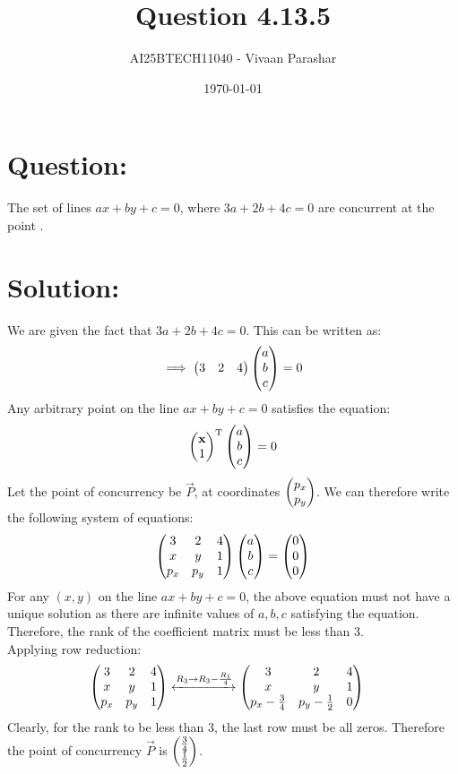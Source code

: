 \documentclass[a4paper, 12pt]{article}
\title{Question 4.13.5}
\author{AI25BTECH11040 - Vivaan Parashar}
\date{\today}
\begin{document}
\maketitle

\section{Question: }
The set of lines $ax + by + c = 0$, where $3a + 2b + 4c = 0$ are concurrent at the point \underline{\hspace{2cm}}.

\section{Solution: }
We are given the fact that $3a + 2b + 4c = 0$. This can be written as:
\begin{align}
    \implies \begin{pmatrix}3 & 2 & 4\end{pmatrix} \begin{pmatrix}a \\ b \\ c\end{pmatrix} = 0 \label{eq1}
\end{align}
Any arbitrary point on the line $ax + by + c = 0$ satisfies the equation:
\begin{align}
    \begin{pmatrix}\mathbf{x} \\ 1\end{pmatrix}^\mathrm{T} \begin{pmatrix}a \\ b \\ c\end{pmatrix} = 0 \label{eq2}
\end{align}
Let the point of concurrency be $\vec{P}$, at coordinates $\begin{pmatrix}p_x \\ p_y\end{pmatrix}$. We can therefore write the following system of equations:
\begin{align}
    \begin{pmatrix}3 & 2 & 4 \\ x & y & 1 \\ p_x & p_y & 1\end{pmatrix} \begin{pmatrix}a \\ b \\ c\end{pmatrix} = \begin{pmatrix}0 \\ 0 \\ 0\end{pmatrix} \label{eq3}
\end{align}
For any $(x, y)$ on the line $ax + by + c = 0$, the above equation must not have a unique solution as there are infinite values of $a, b, c$ satisfying the equation. Therefore, the rank of the coefficient matrix must be less than 3.\\
Applying row reduction:
\begin{align}
    \begin{pmatrix}3 & 2 & 4 \\ x & y & 1 \\ p_x & p_y & 1\end{pmatrix} &\xleftrightarrow{R_3 \rightarrow R_3 - \frac{R_1}{4}} \begin{pmatrix}3 & 2 & 4 \\ x & y & 1 \\ p_x - \frac{3}{4} & p_y - \frac{1}{2} & 0\end{pmatrix}
\end{align}
Clearly, for the rank to be less than 3, the last row must be all zeros. Therefore the point of concurrency $\vec{P}$ is  $\begin{pmatrix}\frac{3}{4} \\ \frac{1}{2}\end{pmatrix}$.
\end{document}
